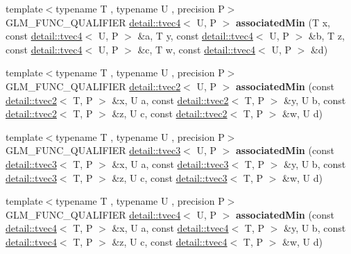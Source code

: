 \begin{DoxyCompactItemize}
\item 
{\footnotesize template$<$typename T , typename U , precision P$>$ }\\G\+L\+M\+\_\+\+F\+U\+N\+C\+\_\+\+Q\+U\+A\+L\+I\+F\+I\+ER \hyperlink{structglm_1_1detail_1_1tvec4}{detail\+::tvec4}$<$ U, P $>$ {\bfseries associated\+Min} (T x, const \hyperlink{structglm_1_1detail_1_1tvec4}{detail\+::tvec4}$<$ U, P $>$ \&a, T y, const \hyperlink{structglm_1_1detail_1_1tvec4}{detail\+::tvec4}$<$ U, P $>$ \&b, T z, const \hyperlink{structglm_1_1detail_1_1tvec4}{detail\+::tvec4}$<$ U, P $>$ \&c, T w, const \hyperlink{structglm_1_1detail_1_1tvec4}{detail\+::tvec4}$<$ U, P $>$ \&d)\hypertarget{namespaceglm_aaffb9a5ffaedf4b36f8ba5279b1471bd}{}\label{namespaceglm_aaffb9a5ffaedf4b36f8ba5279b1471bd}

\item 
{\footnotesize template$<$typename T , typename U , precision P$>$ }\\G\+L\+M\+\_\+\+F\+U\+N\+C\+\_\+\+Q\+U\+A\+L\+I\+F\+I\+ER \hyperlink{structglm_1_1detail_1_1tvec2}{detail\+::tvec2}$<$ U, P $>$ {\bfseries associated\+Min} (const \hyperlink{structglm_1_1detail_1_1tvec2}{detail\+::tvec2}$<$ T, P $>$ \&x, U a, const \hyperlink{structglm_1_1detail_1_1tvec2}{detail\+::tvec2}$<$ T, P $>$ \&y, U b, const \hyperlink{structglm_1_1detail_1_1tvec2}{detail\+::tvec2}$<$ T, P $>$ \&z, U c, const \hyperlink{structglm_1_1detail_1_1tvec2}{detail\+::tvec2}$<$ T, P $>$ \&w, U d)\hypertarget{namespaceglm_a84819fd961424ab2dbc226ed17025368}{}\label{namespaceglm_a84819fd961424ab2dbc226ed17025368}

\item 
{\footnotesize template$<$typename T , typename U , precision P$>$ }\\G\+L\+M\+\_\+\+F\+U\+N\+C\+\_\+\+Q\+U\+A\+L\+I\+F\+I\+ER \hyperlink{structglm_1_1detail_1_1tvec3}{detail\+::tvec3}$<$ U, P $>$ {\bfseries associated\+Min} (const \hyperlink{structglm_1_1detail_1_1tvec3}{detail\+::tvec3}$<$ T, P $>$ \&x, U a, const \hyperlink{structglm_1_1detail_1_1tvec3}{detail\+::tvec3}$<$ T, P $>$ \&y, U b, const \hyperlink{structglm_1_1detail_1_1tvec3}{detail\+::tvec3}$<$ T, P $>$ \&z, U c, const \hyperlink{structglm_1_1detail_1_1tvec3}{detail\+::tvec3}$<$ T, P $>$ \&w, U d)\hypertarget{namespaceglm_ab3c49e83b34be39dffcdd3bcffb69d6a}{}\label{namespaceglm_ab3c49e83b34be39dffcdd3bcffb69d6a}

\item 
{\footnotesize template$<$typename T , typename U , precision P$>$ }\\G\+L\+M\+\_\+\+F\+U\+N\+C\+\_\+\+Q\+U\+A\+L\+I\+F\+I\+ER \hyperlink{structglm_1_1detail_1_1tvec4}{detail\+::tvec4}$<$ U, P $>$ {\bfseries associated\+Min} (const \hyperlink{structglm_1_1detail_1_1tvec4}{detail\+::tvec4}$<$ T, P $>$ \&x, U a, const \hyperlink{structglm_1_1detail_1_1tvec4}{detail\+::tvec4}$<$ T, P $>$ \&y, U b, const \hyperlink{structglm_1_1detail_1_1tvec4}{detail\+::tvec4}$<$ T, P $>$ \&z, U c, const \hyperlink{structglm_1_1detail_1_1tvec4}{detail\+::tvec4}$<$ T, P $>$ \&w, U d)\hypertarget{namespaceglm_a7a99e340d512bb7a18974ee56f22132e}{}\label{namespaceglm_a7a99e340d512bb7a18974ee56f22132e}


\end{DoxyCompactItemize}
